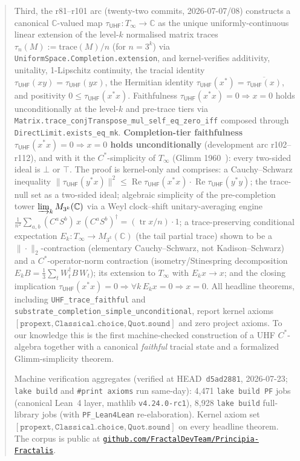 \documentclass[11pt,a4paper]{amsart}
\theoremstyle{plain}
\theoremstyle{definition}
\begin{document}
\begin{abstract}
\noindent Third, the r81--r101 arc (twenty-two commits, 2026-07-07/08) constructs a canonical $\mathbb{C}$-valued map $\tau_{\textsf{UHF}} \colon T_\infty \to \mathbb{C}$ as the unique uniformly-continuous linear extension of the level-$k$ normalised matrix traces $\tau_n(M) := \mathrm{trace}(M)/n$ (for $n = 3^k$) via \texttt{UniformSpace.Completion.extension}, and kernel-verifies additivity, unitality, 1-Lipschitz continuity, the tracial identity $\tau_{\textsf{UHF}}(xy) = \tau_{\textsf{UHF}}(yx)$, the Hermitian identity $\tau_{\textsf{UHF}}(x^*) = \overline{\tau_{\textsf{UHF}}(x)}$, and positivity $0 \le \tau_{\textsf{UHF}}(x^* x)$. Faithfulness $\tau_{\textsf{UHF}}(x^* x) = 0 \Rightarrow x = 0$ holds unconditionally at the level-$k$ and pre-trace tiers via \texttt{Matrix.trace\_conjTranspose\_mul\_self\_eq\_zero\_iff} composed through \texttt{DirectLimit.exists\_eq\_mk}. \textbf{Completion-tier faithfulness $\tau_{\textsf{UHF}}(x^* x) = 0 \Rightarrow x = 0$ holds unconditionally} (development arc r102--r112), and with it the $C^*$-simplicity of $T_\infty$ (Glimm 1960~\cite{glimm1960}): every two-sided ideal is $\bot$ or $\top$. The proof is kernel-only and comprises: a Cauchy--Schwarz inequality $\|\tau_{\textsf{UHF}}(y^*x)\|^2 \le \operatorname{Re}\tau_{\textsf{UHF}}(x^*x)\cdot\operatorname{Re}\tau_{\textsf{UHF}}(y^*y)$; the trace-null set as a two-sided ideal; algebraic simplicity of the pre-completion tower $\varinjlim_k M_{3^k}(\mathbb{C})$ via a Weyl clock--shift unitary-averaging engine $\tfrac{1}{n^2}\sum_{a,b}(C^aS^b)\,x\,(C^aS^b)^\dagger = (\operatorname{tr}x/n)\cdot 1$; a trace-preserving conditional expectation $E_k \colon T_\infty \to M_{3^k}(\mathbb{C})$ (the tail partial trace) shown to be a $\|\cdot\|_2$-contraction (elementary Cauchy--Schwarz, not Kadison--Schwarz) and a $C^*$-operator-norm contraction (isometry/Stinespring decomposition $E_k B = \tfrac{1}{3}\sum_t W_t^\dagger B\, W_t$); its extension to $T_\infty$ with $E_k x \to x$; and the closing implication $\tau_{\textsf{UHF}}(x^*x)=0 \Rightarrow \forall k\, E_k x = 0 \Rightarrow x=0$. All headline theorems, including \texttt{UHF\_trace\_faithful} and \texttt{substrate\_completion\_simple\_unconditional}, report kernel axioms $[\texttt{propext}, \texttt{Classical.choice}, \texttt{Quot.sound}]$ and zero project axioms. To our knowledge this is the first machine-checked construction of a UHF $C^*$-algebra together with a canonical \emph{faithful} tracial state and a formalized Glimm-simplicity theorem.

\smallskip

\noindent Machine verification aggregates (verified at HEAD~\texttt{d5ad2881}, 2026-07-23; \texttt{lake build} and \texttt{\#print axioms} run same-day): 4{,}471 \texttt{lake build PF} jobs (canonical Lean~4 layer, mathlib \texttt{v4.24.0-rc1}), 8{,}928 \texttt{lake build} full-library jobs (with \texttt{PF\_Lean4Lean} re-elaboration). Kernel axiom set $[\texttt{propext}, \texttt{Classical.choice}, \texttt{Quot.sound}]$ on every headline theorem. The corpus is public at \href{https://github.com/FractalDevTeam/Principia-Fractalis}{\texttt{github.com/FractalDevTeam/Principia-Fractalis}}.
\end{abstract}
\end{document}

